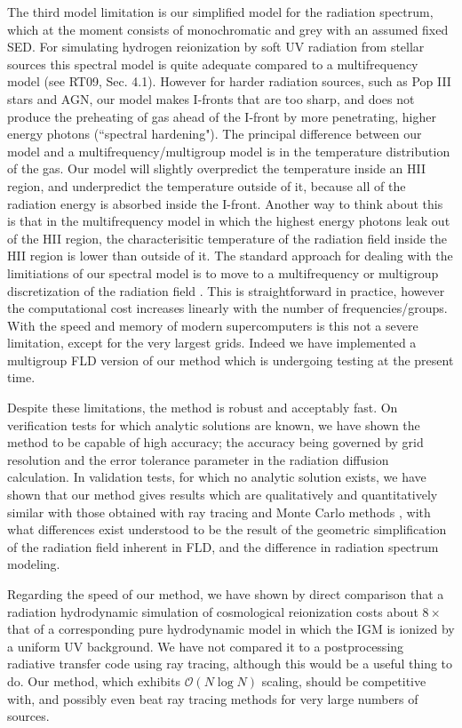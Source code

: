 The third model limitation is our simplified model for the radiation spectrum, which at the moment consists of 
monochromatic and grey with an assumed fixed SED. For simulating hydrogen reionization by soft UV radiation
from stellar sources
this spectral model is quite adequate compared to a multifrequency model (see RT09, Sec. 4.1). However for
harder radiation sources, such as Pop III stars and AGN, our model makes I-fronts that are too sharp, and does
not produce the preheating of gas ahead of the I-front by more penetrating, higher energy photons (``spectral
hardening"). The principal difference between our model and a multifrequency/multigroup model is in the temperature
distribution of the gas. Our model will slightly overpredict the temperature inside an HII region, and underpredict
the temperature outside of it, because all of the radiation energy is absorbed inside the I-front. Another way to
think about this is that in the multifrequency model in which the highest energy photons leak out of the HII region,
the characterisitic temperature of the radiation field inside the HII region is lower than outside of it. The standard
approach for dealing with the limitiations of our spectral model is to move to a multifrequency or multigroup 
discretization of the radiation field \citep{MirochaEtAl2012}. This is straightforward in practice, however the computational cost
increases linearly with the number of frequencies/groups. With the speed and memory of modern supercomputers
is this not a severe limitation, except for the very largest grids. Indeed we have implemented a multigroup FLD 
version of our method which is undergoing testing at the present time. 

Despite these limitations, the method is robust and acceptably fast. On verification tests for which analytic 
solutions are known, we have shown the method to be capable of high accuracy; the accuracy being
governed by grid resolution and the error tolerance parameter in the radiation diffusion calculation.
In validation tests, for which no analytic solution exists, we have shown that our method gives results which are 
qualitatively and quantitatively similar with those obtained with ray tracing and Monte Carlo methods 
\citep{IlievEtAl2006,IlievEtAl2009,Petkova09,WiseAbel11}, with what differences exist understood to be the result of the geometric
simplification of the radiation field inherent in FLD, and the difference in radiation spectrum modeling.
 
Regarding the speed of our method, we have shown by direct comparison that a radiation hydrodynamic
simulation of cosmological reionization costs about $8 \times$ that of a corresponding pure hydrodynamic
model in which the IGM is ionized by a uniform UV background. We have not compared it to a postprocessing
radiative transfer code using ray tracing, although this would be a useful thing to do. Our method, which 
exhibits $\mathcal O(N\log N)$ scaling, should be competitive with, and possibly even beat ray tracing methods for 
very large numbers of sources.

